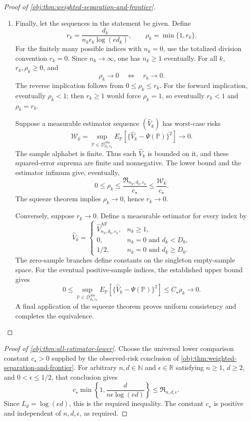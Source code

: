 \documentclass[11pt]{article}
\begin{document}
\begin{proof}[Proof of \cref{obj:thm:weighted-separation-and-frontier}]
\begin{enumerate}
\item
Finally, let the sequences in the statement be given. Define
\[
r_k=\frac{d_k}{n_k\epsilon_k\log(ed_k)},
\qquad
\rho_k=\min\{1,r_k\}.
\]
For the finitely many possible indices with \(n_k=0\), use the totalized division convention \(r_k=0\). Since \(n_k\to\infty\), one has \(n_k\ge1\) eventually. For all \(k\), \(r_k,\rho_k\ge0\), and
\[
\rho_k\longrightarrow0
\quad\Longleftrightarrow\quad
r_k\longrightarrow0.
\]
The reverse implication follows from \(0\le\rho_k\le r_k\).
For the forward implication, eventually \(\rho_k<1\); then
\(r_k\ge1\) would force \(\rho_k=1\), so eventually
\(r_k<1\) and \(\rho_k=r_k\).

Suppose a measurable estimator sequence \((\widehat V_k)\) has worst-case risks
\[
\mathcal W_k
=
\sup_{\mathbb P\in\mathcal D_{d_k,\epsilon_k}^{\mathrm{obs}}}
E_{\mathbb P}
[\{\widehat V_k-\Psi(\mathbb P)\}^2]
\longrightarrow0.
\]
The sample alphabet is finite. Thus each \(\widehat V_k\) is bounded on it, and these squared-error suprema are finite and nonnegative. The lower bound and the estimator infimum give, eventually,
\[
0\le\rho_k
\le\frac{\mathfrak R_{n_k,d_k,\epsilon_k}}{c_\star}
\le\frac{\mathcal W_k}{c_\star}.
\]
The squeeze theorem implies \(\rho_k\to0\), hence \(r_k\to0\).

Conversely, suppose \(r_k\to0\). Define a measurable estimator for every index by
\[
\widehat V_k=
\begin{cases}
\widehat V_{n_k,d_k,\epsilon_k}^{\mathrm{AF}},&n_k\ge1,\\
0,&n_k=0\text{ and }d_k<D_0,\\
1/2,&n_k=0\text{ and }d_k\ge D_0.
\end{cases}
\]
The zero-sample branches define constants on the singleton empty-sample space. For the eventual positive-sample indices, the established upper bound gives
\[
0\le
\sup_{\mathbb P\in\mathcal D_{d_k,\epsilon_k}^{\mathrm{obs}}}
E_{\mathbb P}
[\{\widehat V_k-\Psi(\mathbb P)\}^2]
\le C_\star\rho_k\longrightarrow0.
\]
A final application of the squeeze theorem proves uniform consistency and completes the equivalence.
\end{enumerate}
\end{proof}

\begin{proof}[Proof of \cref{obj:thm:all-estimator-lower}]
Choose the universal lower comparison constant \(c_\star>0\) supplied by the observed-risk conclusion of \cref{obj:thm:weighted-separation-and-frontier}. For arbitrary \(n,d\in\mathbb N\) and \(\epsilon\in\mathbb R\) satisfying \(n\ge1\), \(d\ge2\), and \(0<\epsilon\le1/2\), that conclusion gives
\[
c_\star\min\left\{1,\frac{d}{n\epsilon\log(ed)}\right\}
\le \mathfrak R_{n,d,\epsilon}.
\]
Since \(L_d=\log(ed)\), this is the required inequality. The constant \(c_\star\) is positive and independent of \(n,d,\epsilon\), as required.
\end{proof}




\end{document}
